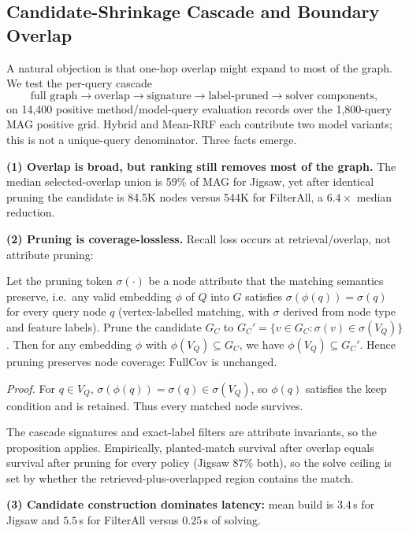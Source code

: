 \documentclass[runningheads]{llncs}
\begin{document}
\subsection{Candidate-Shrinkage Cascade and Boundary Overlap}
\label{sec:shrinkage}

A natural objection is that one-hop overlap might expand to most of the graph. We test the per-query cascade
\[
\text{full graph} \to \text{overlap} \to \text{signature} \to \text{label-pruned} \to \text{solver components},
\]
on 14{,}400 positive method/model-query evaluation records over the 1{,}800-query MAG positive grid. Hybrid and Mean-RRF each contribute two model variants; this is not a unique-query denominator. Three facts emerge.

\textbf{(1) Overlap is broad, but ranking still removes most of the graph.} The median selected-overlap union is 59\% of MAG for Jigsaw, yet after identical pruning the candidate is 84.5K nodes versus 544K for FilterAll, a $6.4\times$ median reduction.

\textbf{(2) Pruning is coverage-lossless.} Recall loss occurs at retrieval/overlap, not attribute pruning:

\begin{proposition}
\label{prop:lossless}
Let the pruning token $\sigma(\cdot)$ be a node attribute that the matching semantics preserve, i.e.\ any valid embedding $\phi$ of $Q$ into $G$ satisfies $\sigma(\phi(q))=\sigma(q)$ for every query node $q$ (vertex-labelled matching, with $\sigma$ derived from node type and feature labels). Prune the candidate $G_C$ to $G_C'=\{v\in G_C : \sigma(v)\in \sigma(V_Q)\}$. Then for any embedding $\phi$ with $\phi(V_Q)\subseteq G_C$, we have $\phi(V_Q)\subseteq G_C'$. Hence pruning preserves node coverage: $\mathrm{FullCov}$ is unchanged.
\end{proposition}
\emph{Proof.} For $q\in V_Q$, $\sigma(\phi(q))=\sigma(q)\in\sigma(V_Q)$, so $\phi(q)$ satisfies the keep condition and is retained. Thus every matched node survives.

\begin{samepage}
The cascade signatures and exact-label filters are attribute invariants, so the proposition applies. Empirically, planted-match survival after overlap equals survival after pruning for every policy (Jigsaw $87\%$ both), so the solve ceiling is set by whether the retrieved-plus-overlapped region contains the match.
\end{samepage}

\textbf{(3) Candidate construction dominates latency:} mean build is $3.4$\,s for Jigsaw and $5.5$\,s for FilterAll versus $0.25$\,s of solving.
\end{document}
